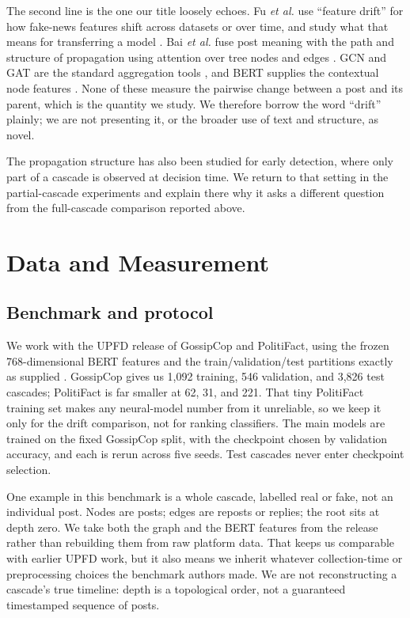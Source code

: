 \documentclass[conference]{IEEEtran}
\begin{document}
The second line is the one our title loosely echoes. Fu \emph{et al.} use
``feature drift'' for how fake-news features shift across datasets or over time,
and study what that means for transferring a model \cite{fu2023drift}. Bai
\emph{et al.} fuse post meaning with the path and structure of propagation
using attention over tree nodes and edges \cite{bai2023tree}. GCN and GAT are
the standard aggregation tools \cite{kipf2017gcn,velickovic2018gat}, and BERT
supplies the contextual node features \cite{devlin2019bert}. None of these
measure the pairwise change between a post and its parent, which is the quantity
we study. We therefore borrow the word ``drift'' plainly; we are not presenting
it, or the broader use of text and structure, as novel.

The propagation structure has also been studied for early detection, where only
part of a cascade is observed at decision time. We return to that setting in the
partial-cascade experiments and explain there why it asks a different question
from the full-cascade comparison reported above.

\section{Data and Measurement}
\subsection{Benchmark and protocol}
We work with the UPFD release of GossipCop and PolitiFact, using the frozen
768-dimensional BERT features and the train/validation/test partitions exactly
as supplied \cite{dou2021upfd}. GossipCop gives us 1,092 training, 546
validation, and 3,826 test cascades; PolitiFact is far smaller at 62, 31, and
221. That tiny PolitiFact training set makes any neural-model number from it
unreliable, so we keep it only for the drift comparison, not for ranking
classifiers. The main models are trained on the fixed GossipCop split, with
the checkpoint chosen by validation accuracy, and each is rerun across five
seeds. Test cascades never enter checkpoint selection.

One example in this benchmark is a whole cascade, labelled real or fake, not an
individual post. Nodes are posts; edges are reposts or replies; the root sits
at depth zero. We take both the graph and the BERT features from the release
rather than rebuilding them from raw platform data. That keeps us comparable
with earlier UPFD work, but it also means we inherit whatever collection-time
or preprocessing choices the benchmark authors made. We are not reconstructing
a cascade's true timeline: depth is a topological order, not a guaranteed
timestamped sequence of posts.
\end{document}
